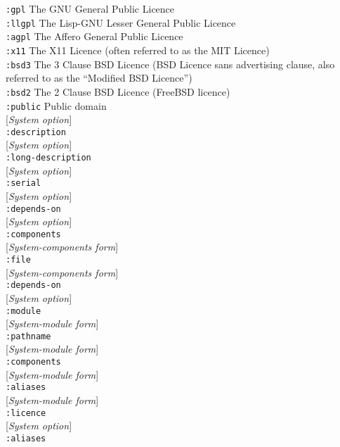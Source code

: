 \documentclass[10pt]{book}
\newenvironment{defother}[2]{[\textit{#1}]\\\texttt{#2}}{\\}
\begin{document}
\texttt{:gpl} The GNU General Public Licence\\
\texttt{:llgpl} The Lisp-GNU Lesser General Public Licence\\
\texttt{:agpl} The Affero General Public Licence\\
\texttt{:x11} The X11 Licence (often referred to as the MIT Licence)\\
\texttt{:bsd3} The 3 Clause BSD Licence (BSD Licence sans advertising clause, also referred to as the ``Modified BSD Licence'')\\
\texttt{:bsd2} The 2 Clause BSD Licence (FreeBSD licence)\\
\texttt{:public} Public domain\\
 
\begin{defother}{System option}{:description}\end{defother}
\begin{defother}{System option}{:long-description}\end{defother}
\begin{defother}{System option}{:serial}\end{defother}
\begin{defother}{System option}{:depends-on}\end{defother}
\begin{defother}{System option}{:components}\end{defother}
\begin{defother}{System-components form}{:file}\end{defother}
\begin{defother}{System-components form}{:depends-on} %
\end{defother}
\begin{defother}{System option}{:module}\end{defother}%
\begin{defother}{System-module form}{:pathname}\end{defother}
\begin{defother}{System-module form}{:components}\end{defother}
\begin{defother}{System-module form}{:aliases}\end{defother}
\begin{defother}{System-module form}{:licence}\end{defother}
\begin{defother}{System option}{:aliases}\end{defother}
\end{document}
